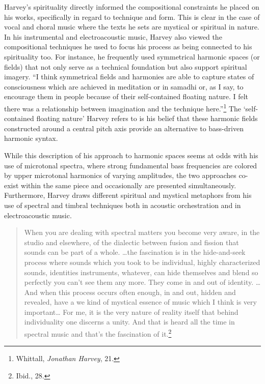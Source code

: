 Harvey's spirituality directly informed the compositional constraints he placed on his works, specifically in regard to technique and form. This is clear in the case of vocal and choral music where the texts he sets are mystical or spiritual in nature. In his instrumental and electroacoustic music, Harvey also viewed the compositional techniques he used to focus his process as being connected to his spirituality too. For instance, he frequently used symmetrical harmonic spaces (or fields) that not only serve as a technical foundation but also support spiritual imagery. ``I think symmetrical fields and harmonies are able to capture states of consciousness which are achieved in meditation or in samadhi or, as I say, to encourage them in people because of their self-contained floating nature. I felt there was a relationship between imagination and the technique here.''\footnote{Whittall, \emph{Jonathan Harvey}, 21. } The `self-contained floating nature' Harvey refers to is his belief that these harmonic fields constructed around a central pitch axis provide an alternative to bass-driven harmonic syntax.

While this description of his approach to harmonic spaces seems at odds with his use of microtonal spectra, where strong fundamental bass frequencies are colored by upper microtonal harmonics of varying amplitudes, the two approaches co-exist within the same piece and occasionally are presented simultaneously. Furthermore, Harvey draws different spiritual and mystical metaphors from his use of spectral and timbral techniques both in acoustic orchestration and in electroacoustic music.

\singlespacing

\begin{quote}
When you are dealing with spectral matters you become very aware, in the studio and elsewhere, of the dialectic between fusion and fission that sounds can be part of a whole. \ldots{}the fascination is in the hide-and-seek process where sounds which you took to be individual, highly characterized sounds, identities instruments, whatever, can hide themselves and blend so perfectly you can't see them any more. They come in and out of identity. \ldots{} And when this process occurs often enough, in and out, hidden and revealed, have a we kind of mystical essence of music which I think is very important\ldots{} For me, it is the very nature of reality itself that behind individuality one discerns a unity. And that is heard all the time in spectral music and that's the fascination of it.\footnote{Ibid., 28. }
\end{quote}

